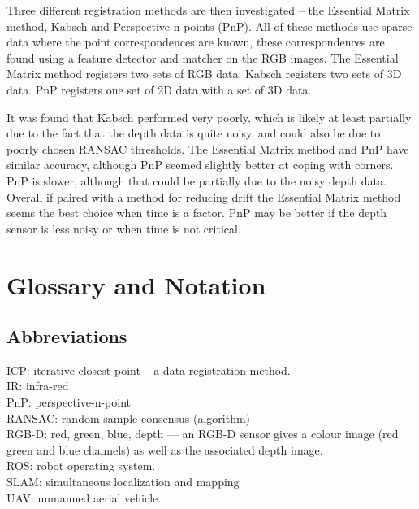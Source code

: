 \documentclass[12pt,a4paper]{article}
\begin{document}
 
Three different registration methods are then investigated -- the Essential Matrix method, Kabsch and Perspective-n-points (PnP). All of these methods use sparse data where the point correspondences are known, these correspondences are found using a feature detector and matcher on the RGB images. The Essential Matrix method registers two sets of RGB data. Kabsch registers two sets of 3D data. PnP registers one set of 2D data with a set of 3D data.
 
It was found that Kabsch performed very poorly, which is likely at least partially due to the fact that the depth data is quite noisy, and could also be due to poorly chosen RANSAC thresholds. The Essential Matrix method and PnP have similar accuracy, although PnP seemed slightly better at coping with corners. PnP is slower, although that could be partially due to the noisy depth data. Overall if paired with a method for reducing drift the Essential Matrix method seems the best choice when time is a factor. PnP may be better if the depth sensor is less noisy or when time is not critical.

\pagebreak
\tableofcontents

\newpage
{}
\section{Glossary and Notation}
\label{sec: g and n}
\subsection{Abbreviations}
\label{ssec: abb}
ICP: iterative closest point -- a data registration method. \\
IR: infra-red \\
PnP: perspective-n-point \\
RANSAC: random sample consensus (algorithm) \\
RGB-D: red, green, blue, depth --- an RGB-D sensor gives a colour image (red green and blue channels) as well as the associated depth image. \\
ROS: robot operating system. \\
SLAM: simultaneous localization and mapping \\
UAV: unmanned aerial vehicle. 
\end{document}
